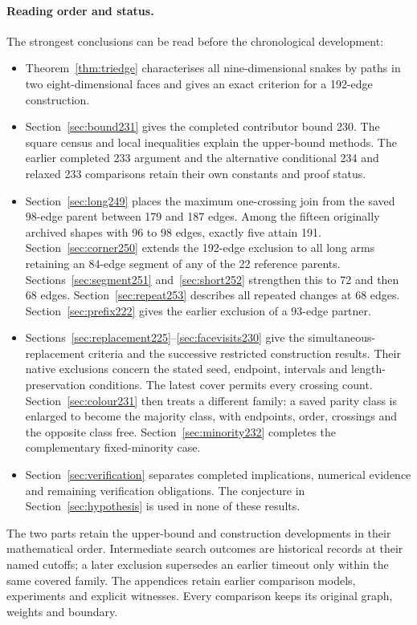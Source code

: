 \documentclass[11pt,a4paper]{article}
\theoremstyle{definition}
\theoremstyle{remark}
\begin{document}
\paragraph{Reading order and status.}
The strongest conclusions can be read before the chronological development:
\begin{itemize}
\item Theorem~\ref{thm:triedge} characterises all nine-dimensional snakes
by paths in two eight-dimensional faces and gives an exact criterion
for a 192-edge construction.
\item Section~\ref{sec:bound231} gives the completed contributor bound 230.
The square census and local inequalities explain the upper-bound methods.
The earlier completed 233 argument and the alternative conditional 234
and relaxed 233 comparisons retain their own constants and proof status.
\item Section~\ref{sec:long249} places the maximum one-crossing join from
the saved 98-edge parent between 179 and 187 edges. Among the fifteen
originally archived shapes with 96 to 98 edges, exactly five attain 191.
Section~\ref{sec:corner250} extends the 192-edge exclusion to all
long arms retaining an 84-edge segment of any of the 22 reference parents.
Sections~\ref{sec:segment251} and~\ref{sec:short252} strengthen this to 72 and then 68 edges. Section~\ref{sec:repeat253} describes all repeated changes at 68 edges.
Section~\ref{sec:prefix222} gives the earlier exclusion of a 93-edge partner.
\item Sections~\ref{sec:replacement225}--\ref{sec:facevisits230} give the
simultaneous-replacement criteria and the successive restricted construction
results. Their native exclusions concern the stated seed, endpoint,
intervals and length-preservation conditions. The latest cover permits
every crossing count.
Section~\ref{sec:colour231} then treats a different family: a saved parity
class is enlarged to become the majority class, with endpoints, order,
crossings and the opposite class free. Section~\ref{sec:minority232}
completes the complementary fixed-minority case.
\item Section~\ref{sec:verification} separates completed implications,
numerical evidence and remaining verification obligations. The conjecture
in Section~\ref{sec:hypothesis} is used in none of these results.
\end{itemize}
The two parts retain the upper-bound and construction developments in
their mathematical order. Intermediate search outcomes are historical
records at their named cutoffs; a later exclusion supersedes an earlier
timeout only within the same covered family. The appendices retain earlier
comparison models, experiments and explicit witnesses. Every comparison
keeps its original graph, weights and boundary.
\end{document}
